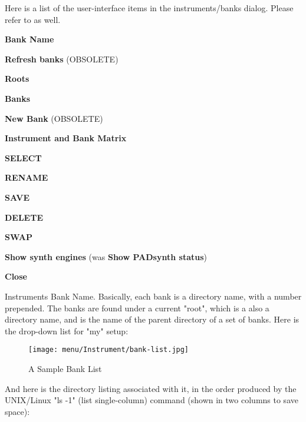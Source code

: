    Here is a list of the user-interface items in the instruments/banks dialog.
   Please refer to 
    as well.

   \begin{enumber}
      \item \textbf{Bank Name}
      \item \textbf{Refresh banks} (OBSOLETE)
      \item \textbf{Roots}
      \item \textbf{Banks}
      \item \textbf{New Bank} (OBSOLETE)
      \item \textbf{Instrument and Bank Matrix}
      \item \textbf{SELECT}
      \item \textbf{RENAME}
      \item \textbf{SAVE}
      \item \textbf{DELETE}
      \item \textbf{SWAP}
      \item \textbf{Show synth engines}
         (was \textbf{Show PADsynth status})
      \item \textbf{Close}
   \end{enumber}

   \setcounter{ItemCounter}{0}      %

   Instruments Bank Name.
   Basically, each bank is a directory name, with a number prepended.
   The banks are found under a current "root", which is a also a directory
   name, and is the name of the parent directory of a set of banks.
   Here is the drop-down list for "my" setup:

\begin{figure}[H]
   \centering 
   \texttt{[image: menu/Instrument/bank-list.jpg]}
   \caption[A Sample Bank List]{A Sample Bank List}
   \label{fig:bank_list}
\end{figure}

   And here is the directory listing associated with it, in the order
   produced by the UNIX/Linux "ls -1" (list single-column) command (shown in
   two columns to save space):

